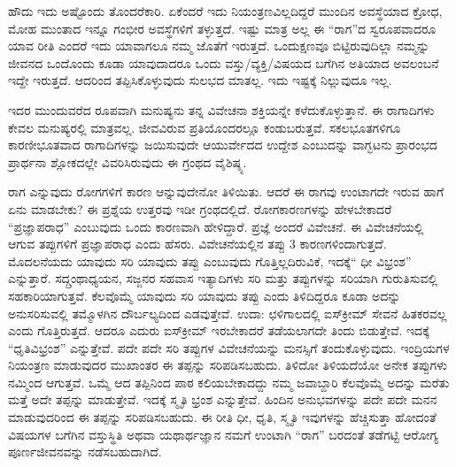 ಹೌದು ಇದು ಅಷ್ಟೊಂದು ತೊಂದರೆಕಾರಿ. ಏಕೆಂದರೆ ಇದು ನಿಯಂತ್ರಣವಿಲ್ಲದಿದ್ದರೆ  ಮುಂದಿನ ಅವಸ್ಥೆಯಾದ ಕ್ರೋಧ, ಮೋಹ ಮುಂತಾದ ಇನ್ನೂ ಗಂಭೀರ ಅವಸ್ಥೆಗಳಿಗೆ ತಳ್ಳುತ್ತದೆ. ಇಷ್ಟು ಮಾತ್ರ ಅಲ್ಲ ಈ “ರಾಗ”ದ ಸ್ವರೂಪವಾದರೂ ಯಾವ ರೀತಿ ಎಂದರೆ ಇದು ಯಾವಾಗಲೂ ನಮ್ಮ ಜೊತೆಗೆ ಇರುತ್ತದೆ. ಒಂದುಕ್ಷಣವೂ ಬಿಟ್ಟಿರುವುದಿಲ್ಲಾ ನಮ್ಮನ್ನು ಜೀವನದ ಒಂದೊಂದು ಕೂಡಾ ಯಾವುದಾದರೂ ಒಂದು ವಸ್ತು/ವ್ಯಕ್ತಿ/ವಿಷಯದ ಬಗೆಗಿನ ಅತಿಯಾದ ಅವಲಂಬನೆ ಇದ್ದೇ ಇರುತ್ತದೆ. ಆದರಿಂದ ತಪ್ಪಿಸಿಕೊಳ್ಳುವುದು ಸುಲಭದ ಮಾತಲ್ಲ. ಇದು ಇಷ್ಟಕ್ಕೆ ನಿಲ್ಲುವುದೂ ಇಲ್ಲ.

ಇದರ ಮುಂದುವರೆದ ರೂಪವಾಗಿ ಮನುಷ್ಯನು ತನ್ನ ವಿವೇಚನಾ ಶಕ್ತಿಯನ್ನೇ ಕಳೆದುಕೊಳ್ಳುತ್ತಾನೆ. ಈ ರಾಗಾದಿಗಳು ಕೇವಲ ಮನುಷ್ಯರಲ್ಲಿ ಮಾತ್ರವಲ್ಲ. ಜೀವವಿರುವ ಪ್ರತಿಯೊಂದರಲ್ಲೂ ಕಂಡುಬರುತ್ತವೆ.  ಸಕಲಭೂತಗಳಿಗೂ ಕಾರಣೀಭೂತವಾದ ರಾಗಾದಿಗಳನ್ನು ಜಯಿಸುವುದೇ ಆಯುರ್ವೇದದ ಉದ್ದೇಶ ಎಂಬುದನ್ನು ವಾಗ್ಭಟನು ಪ್ರಾರಂಭದ ಪ್ರಾರ್ಥನಾ ಶ್ಲೋಕದಲ್ಲೇ ವಿವರಿಸಿರುವುದು ಈ ಗ್ರಂಥದ ವೈಶಿಷ್ಠ್ಯ.

ರಾಗ ಎನ್ನುವುದು ರೋಗಗಳಿಗೆ ಕಾರಣ ಆನ್ನುವುದೇನೋ ತಿಳಿಯಿತು. ಆದರೆ ಈ ರಾಗವು ಉಂಟಾಗದೇ ಇರುವ ಹಾಗೆ ಏನು ಮಾಡಬೇಕು? ಈ ಪ್ರಶ್ನೆಯ ಉತ್ತರವು ಇಡೀ ಗ್ರಂಥದಲ್ಲಿದೆ. ರೋಗಕಾರಣಗಳನ್ನು ಹೇಳಬೇಕಾದರೆ “ಪ್ರಜ್ಞಾಪರಾಧ” ಎಂಬುವುದು ಒಂದು ಕಾರಣವಾಗಿ ಹೇಳಿದ್ದಾರೆ. ಪ್ರಜ್ಞೆ ಅಂದರೆ ವಿವೇಚನೆ. ಈ ವಿವೇಚನೆಯಲ್ಲಿ ಆಗುವ ತಪ್ಪುಗಳಿಗೆ ಪ್ರಜ್ಞಾಪರಾಧ ಎಂದು ಹೆಸರು. ವಿವೇಚನೆಯಲ್ಲಿನ ತಪ್ಪು 3 ಕಾರಣಗಳಿಂದಾಗುತ್ತದೆ. ಮೊದಲನೆಯದು ಯಾವುದು ಸರಿ ಯಾವುದು ತಪ್ಪು ಎಂಬುವುದು ಗೊತ್ತಿಲ್ಲದಿರುವಿಕೆ, ಇದಕ್ಕೆ“ ಧೀ ವಿಭ್ರಂಶ” ಎನ್ನುತ್ತಾರೆ. ಸದ್ಗ್ರಂಥಾಧ್ಯಯನ, ಸಜ್ಜನರ ಸಹವಾಸ ಇತ್ಯಾದಿಗಳು ಸರಿ ಮತ್ತು ತಪ್ಪುಗಳನ್ನು ಸರಿಯಾಗಿ ಗುರುತಿಸುವಲ್ಲಿ ಸಹಕಾರಿಯಾಗುತ್ತವೆ. ಕೆಲವೊಮ್ಮೆ ಯಾವುದು ಸರಿ ಯಾವುದು ತಪ್ಪು ಎಂದು ತಿಳಿದಿದ್ದರೂ ಕೂಡಾ ಅದನ್ನು ಅನುಸರಿಸುವಲ್ಲಿ ತಮ್ಮೊಳಗಿನ ದೌರ್ಬಲ್ಯದಿಂದ ಎಡವುತ್ತೇವೆ. ಉದಾ: ಛಳಿಗಾಲದಲ್ಲಿ  ಐಸ್‍ಕ್ರೀಮ್ ಸೇವನೆ ಹಿತಕರವಲ್ಲ ಎಂದು ಗೊತ್ತಿರುತ್ತದೆ. ಆದರೂ ಎದುರು ಐಸ್‍ಕ್ರೀಮ್ ಇರಬೇಕಾದರೆ ತಡೆಯಲಾಗದೇ ತಿಂದು ಬಿಡುತ್ತೇವೆ. ಇದಕ್ಕೆ “ಧೃತಿವಿಭ್ರಂಶ” ಎನ್ನುತ್ತೇವೆ. ಪದೇ ಪದೇ ಸರಿ ತಪ್ಪುಗಳ ವಿವೇಚನೆಯನ್ನು ಮನಸ್ಸಿಗೆ ತಂದುಕೊಳ್ಳುವುದು. ಇಂದ್ರಿಯಗಳ ನಿಯಂತ್ರಣ ಮಾಡುವುದರ ಮುಖಾಂತರ ಈ ತಪ್ಪನ್ನು ಸರಿಪಡಿಸಬಹುದು. ತಿಳಿದೋ ತಿಳಿಯದೆಯೋ ಅನೇಕ ತಪ್ಪುಗಳು ನಮ್ಮಿಂದ ಆಗುತ್ತವೆ. ಒಮ್ಮೆ ಆದ ತಪ್ಪಿನಿಂದ ಪಾಠ ಕಲಿಯಬೇಕಾದದ್ದು ನಮ್ಮ ಜವಾಬ್ದಾರಿ ಕೆಲವೊಮ್ಮೆ ಅದನ್ನು ಮರೆತು ಮತ್ತೆ ಅದೇ ತಪ್ಪನ್ನು ಮಾಡುತ್ತೇವೆ. ಇದಕ್ಕೆ ಸ್ಮೃತಿ ಭ್ರಂಶ ಎನ್ನುತ್ತೇವೆ. ಹಿಂದಿನ ಅನುಭವಗಳನ್ನು ಪದೇ ಪದೇ ಮನನ ಮಾಡುವುದರಿಂದ ಈ ತಪ್ಪನ್ನು ಸರಿಪಡಿಸಬಹುದು. ಈ ರೀತಿ ಧೀ, ಧೃತಿ, ಸ್ಮೃತಿ ಇವುಗಳನ್ನು ಹೆಚ್ಚಿಸುತ್ತಾ ಹೋದಂತೆ ವಿಷಯಗಳ ಬಗೆಗಿನ ವಸ್ತುಸ್ಥಿತಿ ಅಥವಾ ಯಥಾರ್ಥಜ್ಞಾನ ನಮಗೆ ಉಂಟಾಗಿ “ರಾಗ” ಬರದಂತೆ ತಡೆಗಟ್ಟಿ ಆರೋಗ್ಯ ಪೂರ್ಣಜೀವನವನ್ನು ನಡೆಸಬಹುದಾಗಿದೆ.

\articleend
